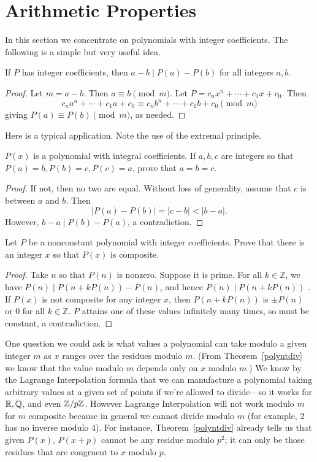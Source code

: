 \section{Arithmetic Properties}\label{poly2s2}
In this section we concentrate on polynomials with integer coefficients. The following is a simple but very useful idea.
\begin{thm}\label{polyntdiv}
If $P$ has integer coefficients, then $a-b\mid P(a)-P(b)$ for all integers $a,b$.
\end{thm}
\begin{proof}
Let $m=a-b$. Then $a\equiv b\pmod m$. Let $P=c_nx^n+\cdots +c_1x+c_0$. Then
\[
c_na^n+\cdots +c_1a+c_0\equiv 
c_nb^n+\cdots +c_1b+c_0\pmod m
\]
giving $P(a)\equiv P(b)\pmod m$, as needed.

\end{proof}
Here is a typical application. Note the use of the extremal principle.
\begin{ex}[USAMO 1974/1] $P(x)$ is a polynomial with integral coefficients. If $a,b,c$ are integers so that $P(a)=b,P(b)=c,P(c)=a$, prove that $a=b=c$.
\end{ex}
\begin{proof}
If not, then no two are equal. Without loss of generality, assume that $c$ is between $a$ and $b$. Then 
\[|P(a)-P(b)|=|c-b|<|b-a|.\]
However, $b-a\mid P(b)-P(a)$, a contradiction.
\end{proof}
\begin{ex}
Let $P$ be a nonconstant polynomial with integer coefficients. Prove that there is an integer $x$ so that $P(x)$ is composite.
\end{ex}
\begin{proof}
Take $n$ so that $P(n)$ is nonzero. Suppose it is prime. For all $k\in \mathbb{Z}$, we have $P(n)\mid P(n+kP(n))-P(n)$, and hence $P(n)\mid P(n+kP(n))$ . If $P(x)$ is not composite for any integer $x$, then $P(n+kP(n))$ is $\pm P(n)$ or 0 for all $k\in \mathbb Z$. $P$ attains one of these values infinitely many times, so must be constant, a contradiction.
\end{proof}

One question we could ask is what values a polynomial can take modulo a given integer $m$ as $x$ ranges over the residues modulo $m$. (From Theorem~\ref{polyntdiv} we know that the value modulo $m$ depends only on $x$ modulo $m$.)
We know by the Lagrange Interpolation formula that we can manufacture a polynomial taking arbitrary values at a given set of points if we're allowed to divide---so it works for $\mathbb{R},\mathbb{Q}$, and even $\mathbb{Z}/p\mathbb{Z}$. However Lagrange Interpolation will not work modulo $m$ for $m$ composite because in general we cannot divide modulo $m$ (for example, 2 has no inverse modulo 4). For instance, Theorem~\ref{polyntdiv} already tells us that given $P(x)$, $P(x+p)$ cannot be any residue modulo $p^2$; it can only be those residues that are congruent to $x$ modulo $p$.

